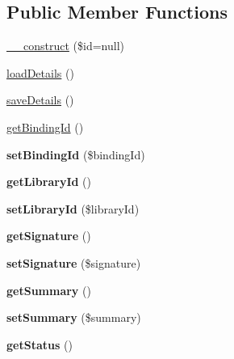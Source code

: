 \subsection*{Public Member Functions}
\begin{DoxyCompactItemize}
\item 
\hyperlink{classBinding_a0abc79cbae099b6074a023de794ba7d6}{\_\-\_\-construct} (\$id=null)
\item 
\hyperlink{classBinding_a023428000f04edf6e7654caedfe023d7}{loadDetails} ()
\item 
\hyperlink{classBinding_a7fe288b95f637d4dee16918f985df0ff}{saveDetails} ()
\item 
\hyperlink{classBinding_a4b2ec4db2835ba983bdbb9bdba2d8d1c}{getBindingId} ()
\item 
\hypertarget{classBinding_a13413fc3d41fd1c16d1126850bd6269f}{
{\bfseries setBindingId} (\$bindingId)}
\label{classBinding_a13413fc3d41fd1c16d1126850bd6269f}

\item 
\hypertarget{classBinding_a63abc7ac21d7109ef72c97501732d3da}{
{\bfseries getLibraryId} ()}
\label{classBinding_a63abc7ac21d7109ef72c97501732d3da}

\item 
\hypertarget{classBinding_a2c07ca02122229ddcf6a4b0dc2820e38}{
{\bfseries setLibraryId} (\$libraryId)}
\label{classBinding_a2c07ca02122229ddcf6a4b0dc2820e38}

\item 
\hypertarget{classBinding_ac4750a8f40efb1bb4daab7a05e0478e4}{
{\bfseries getSignature} ()}
\label{classBinding_ac4750a8f40efb1bb4daab7a05e0478e4}

\item 
\hypertarget{classBinding_ae1e4561829f668650d3c20caaa9233ba}{
{\bfseries setSignature} (\$signature)}
\label{classBinding_ae1e4561829f668650d3c20caaa9233ba}

\item 
\hypertarget{classBinding_ae41bff8d609889249df156c284cd1eda}{
{\bfseries getSummary} ()}
\label{classBinding_ae41bff8d609889249df156c284cd1eda}

\item 
\hypertarget{classBinding_a63f1674374bb03df30a250156b7c1e18}{
{\bfseries setSummary} (\$summary)}
\label{classBinding_a63f1674374bb03df30a250156b7c1e18}

\item 
\hypertarget{classBinding_afd4c273067d8159002849e4d016b6d9b}{
{\bfseries getStatus} ()}
\label{classBinding_afd4c273067d8159002849e4d016b6d9b}


\end{DoxyCompactItemize}
